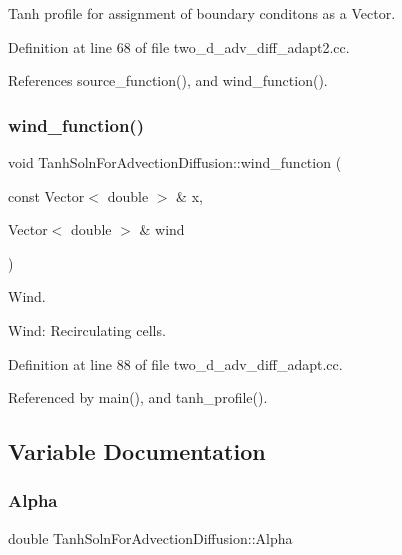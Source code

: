 Tanh profile for assignment of boundary conditons as a Vector. 



Definition at line 68 of file two\+\_\+d\+\_\+adv\+\_\+diff\+\_\+adapt2.\+cc.



References source\+\_\+function(), and wind\+\_\+function().

\mbox{\label{namespaceTanhSolnForAdvectionDiffusion_ab40e93031d34986762c69616c3c8b065}} 
\subsubsection{\texorpdfstring{wind\+\_\+function()}{wind\_function()}}
{\footnotesize\ttfamily void Tanh\+Soln\+For\+Advection\+Diffusion\+::wind\+\_\+function (\begin{DoxyParamCaption}\item[{const Vector$<$ double $>$ \&}]{x,  }\item[{Vector$<$ double $>$ \&}]{wind }\end{DoxyParamCaption})}



Wind. 

Wind\+: Recirculating cells. 

Definition at line 88 of file two\+\_\+d\+\_\+adv\+\_\+diff\+\_\+adapt.\+cc.



Referenced by main(), and tanh\+\_\+profile().



\subsection{Variable Documentation}
\mbox{\label{namespaceTanhSolnForAdvectionDiffusion_a4d202e8ac48cc75f760ef40681402ec7}} 
\subsubsection{\texorpdfstring{Alpha}{Alpha}}
{\footnotesize\ttfamily double Tanh\+Soln\+For\+Advection\+Diffusion\+::\+Alpha}



